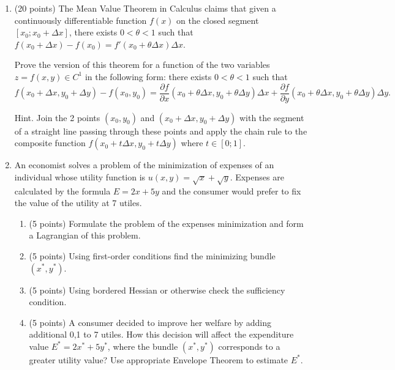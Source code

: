 \documentclass[12pt]{article} %
\theoremstyle{definition} %
\def \putyourname{\fbox{
    \begin{minipage}{42em}
      Name, group no:\vspace*{3ex}\par
      \noindent\dotfill\vspace{2mm}
    \end{minipage}
  }
}
\begin{document}
    \newpage
    \putyourname    
    \begin{enumerate}[resume]
    
      \item (20 points) The Mean Value Theorem in Calculus claims that given a continuously differentiable function $f(x)$  
      on the closed segment $[x_0; x_0 + \Delta x]$, there exists $0 < \theta < 1$ such that $f(x_0 + \Delta x) - f(x_0) = 
      f'(x_0 + \theta \Delta x) \Delta x$. 
    
      Prove the version of this theorem for a function of the two variables $z = f(x,y) \in C^1$ in the following form: 
      there exists $0 < \theta < 1$ such that 
      \[
        f(x_0 + \Delta x, y_0 + \Delta y) - f(x_0, y_0) = \frac{\partial f}{\partial x}(x_0 + \theta \Delta x, y_0 + \theta \Delta y)\Delta x + \frac{\partial f}{\partial y}(x_0 + \theta \Delta x, y_0 + \theta \Delta y)\Delta y.  
      \]
      
      
      Hint. Join the 2 points $(x_0, y_0)$ and $(x_0 + \Delta x, y_0 + \Delta y)$ with the segment of a straight line passing through these points 
      and apply the chain rule to the composite function $f(x_0 + t \Delta x, y_0 + t \Delta y)$ where $t\in [0;1]$.
      
      
      \newpage
      \putyourname
        \item An economist solves a problem of the minimization of expenses of an individual whose utility function is $u(x, y) = \sqrt{x} + \sqrt{y}$. 
      Expenses are calculated by the formula $E=2x + 5y$ and the consumer would prefer to fix the value of the utility at 7 utiles.
      \begin{enumerate}
      \item (5 points) Formulate the problem of the expenses minimization and form a Lagrangian of this problem.
      \item (5 points) Using first-order conditions find the minimizing bundle $(x^*, y^*)$.
      \item (5 points) Using bordered Hessian or otherwise check the sufficiency condition.
      \item (5 points) A consumer decided to improve her welfare by adding additional 0,1 to 7 utiles. 
      How this decision will affect the expenditure value $E^* = 2x^* + 5y^*$, 
      where the bundle $(x^*, y^*)$ corresponds to a greater utility value? 
      Use appropriate Envelope Theorem to estimate $E^*$.
    \end{enumerate}
    
    \end{enumerate}
    
\end{document}
